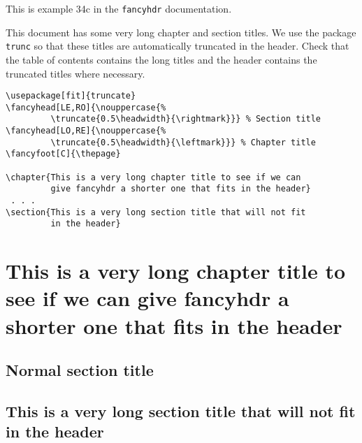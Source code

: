 \documentclass[oneside]{book}
\begin{document}
\thispagestyle{plain}
\tableofcontents

\bigskip

\noindent
\begin{boxedminipage}{\textwidth}
This is example 34c in the \texttt{fancyhdr} documentation.

This document has some very long chapter and section titles. We use the package \texttt{trunc} so that these titles are automatically truncated in the header.
Check that the table of contents contains the long titles and the header contains the truncated titles where necessary.

\begin{verbatim}
\usepackage[fit]{truncate}
\fancyhead[LE,RO]{\nouppercase{%
         \truncate{0.5\headwidth}{\rightmark}}} % Section title
\fancyhead[LO,RE]{\nouppercase{%
         \truncate{0.5\headwidth}{\leftmark}}} % Chapter title
\fancyfoot[C]{\thepage}

\chapter{This is a very long chapter title to see if we can
         give fancyhdr a shorter one that fits in the header}
 . . .
\section{This is a very long section title that will not fit
         in the header}
\end{verbatim}
\end{boxedminipage}

\newpage
\pagestyle{fancy}
\chapter{This is a very long chapter title to see if we can
         give fancyhdr a shorter one that fits in the header}
\thispagestyle{fancy}

\kant[2-4]

\section{Normal section title}

\kant[5-6]

\section{This is a very long section title that will not fit
         in the header}

\kant[7]
\end{document}
